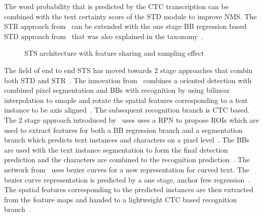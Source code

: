 The word probability that is predicted by the \ac{CTC} transcription can be combined with the
text certainty score of the \ac{STD} module to improve \ac{NMS}.
The \ac{STR} approach from~\cite{shi_aster_2019} can be extended with the one stage
\ac{BB} regression based \ac{STD} approach from~\cite{liao_textboxes_2017} that was also explained
in the taxonomy~\citep{shi_aster_2019}.
\begin{figure}[ht]
    \centering
    \caption[STS architecture with feature sharing]{%
        STS architecture with feature sharing and sampling
        effect~\citep{liu_fots_2018}\label{fig:2-stage-example-LIU-Fots-2018}
    }
\end{figure}
The field of end to end \ac{STS} has moved towards 2 stage approaches that combin both \ac{STD}
and \ac{STR}~\citep{lyu_mask_2018,long_scene_2021}.
The innovation from~\cite{liu_fots_2018} combines a oriented detection with combined pixel
segmentation and \acp{BB} with recognition by using bilinear interpolation to smaple and rotate
the spatial features corresponding to a text instance to be axis aligned~\citep{liu_fots_2018}.
The subsequent recognition branch is \ac{CTC} based.
The 2 stage approach introduced by~\cite{lyu_mask_2018} uses uses a \ac{RPN} to propose \acp{ROI}
which are used to extract features for both a \ac{BB} regression branch and a segmentation branch
which predicts text instances and characters on a pixel level~\citep{lyu_mask_2018}.
The \acp{BB} are used with the text instance segmentation to form the final detection prediction and
the characters are combined to the recognition prediction~\citep{lyu_mask_2018}.
The network from~\cite{liu_abcnet_2020} uses bezier curves for a new representation for curved text.
The bezier curve representation is predicted by a one stage, anchor free
regression~\citep{liu_abcnet_2020}.
The spatial features corresponding to the predicted instances are then extracted from the feature
maps and handed to a lightweight \ac{CTC} based recognition branch~\citep{lyu_mask_2018}.
